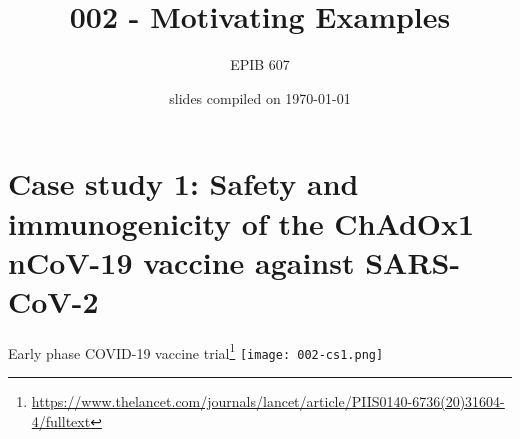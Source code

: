 \documentclass[10pt]{beamer}\usepackage[]{graphicx}\usepackage[]{color}
\begin{document}
	
	
	
	
	\title{002 - Motivating Examples}
	\author{EPIB 607}
	
	\date{slides compiled on \today}
	
	\maketitle

\section{Case study 1: Safety and immunogenicity of the ChAdOx1 nCoV-19	vaccine against SARS-CoV-2}


\begin{frame}{Early phase COVID-19 vaccine trial\footnote{\tiny\url{https://www.thelancet.com/journals/lancet/article/PIIS0140-6736(20)31604-4/fulltext}}}
	\centering
	\texttt{[image: 002-cs1.png]}	
\end{frame}
\end{document}
